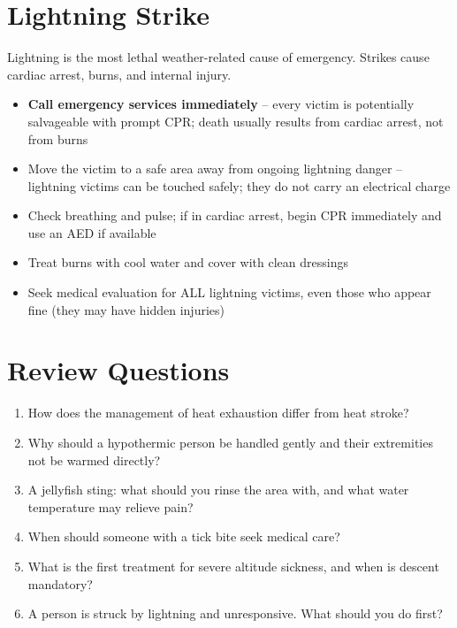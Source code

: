 \section{Lightning Strike}

Lightning is the most lethal weather-related cause of emergency. Strikes cause cardiac arrest, burns, and internal injury.

\begin{itemize}[leftmargin=*]
\item \textbf{Call emergency services immediately} -- every victim is potentially salvageable with prompt CPR; death usually results from cardiac arrest, not from burns
\item Move the victim to a safe area away from ongoing lightning danger -- lightning victims can be touched safely; they do not carry an electrical charge
\item Check breathing and pulse; if in cardiac arrest, begin CPR immediately and use an AED if available
\item Treat burns with cool water and cover with clean dressings
\item Seek medical evaluation for ALL lightning victims, even those who appear fine (they may have hidden injuries)
\end{itemize}

\section{Review Questions}

\begin{enumerate}[leftmargin=*]
\item How does the management of heat exhaustion differ from heat stroke?
\item Why should a hypothermic person be handled gently and their extremities not be warmed directly?
\item A jellyfish sting: what should you rinse the area with, and what water temperature may relieve pain?
\item When should someone with a tick bite seek medical care?
\item What is the first treatment for severe altitude sickness, and when is descent mandatory?
\item A person is struck by lightning and unresponsive. What should you do first?
\end{enumerate}
